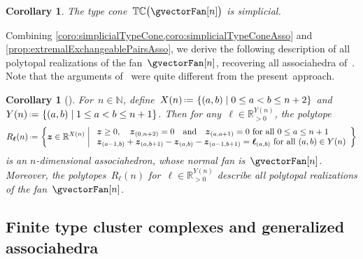 \documentclass{amsart}
\newtheorem{corollary}[theorem]{Corollary}
\theoremstyle{definition}
\newcommand{\R}{\mathbb{R}} %
\newcommand{\N}{\mathbb{N}} %
\renewcommand{\b}[1]{{\boldsymbol{#1}}} %
\newcommand{\set}[2]{\left\{ #1 \;\middle|\; #2 \right\}} %
\newcommand{\eqdef}{\mbox{\,\raisebox{0.2ex}{\scriptsize\ensuremath{\mathrm:}}\ensuremath{=}\,}} %
\newcommand{\vincent}[1]{\todo[color=blue!30]{#1 \\ \hfill --- V.}}
\newcommand{\typeCone}{\mathbb{TC}} %
\begin{document}
\begin{corollary}
\label{coro:simplicialTypeConeAsso}
The type cone~$\typeCone \big( \gvectorFan[n] \big)$ is simplicial.
\end{corollary}

Combining \cref{coro:simplicialTypeCone,coro:simplicialTypeConeAsso} and \cref{prop:extremalExchangeablePairsAsso}, we derive the following description of all polytopal realizations of the fan~$\gvectorFan[n]$, recovering all associahedra of~\cite[Sect.~3.2]{ArkaniHamedBaiHeYan}.
Note that the arguments of~\cite[Sect.~3.2]{ArkaniHamedBaiHeYan} were quite different from the present~approach.

\begin{corollary}[{\cite[Sect.~3.2]{ArkaniHamedBaiHeYan}}]
\label{coro:allPolytopalRealizationsAsso}
For~$n \in \N$, define~$X(n) \eqdef \set{(a,b)}{0 \le a < b \le n+2}$ and~$Y(n) \eqdef \set{(a,b)}{1 \le a < b \le n+1}$.
Then for any~$\b{\ell} \in \R_{>0}^{Y(n)}$, the polytope
\[
R_\b{\ell}(n) \eqdef \set{\b{z} \in \R^{X(n)}}{\begin{array}{l} \b{z} \ge 0, \quad \b{z}_{(0,n+2)} = 0 \quad\text{and}\quad \b{z}_{(a,a+1)} = 0 \text{ for all } 0 \le a \le n+1 \\ \b{z}_{(a-1,b)} + \b{z}_{(a,b+1)} - \b{z}_{(a,b)} - \b{z}_{(a-1,b+1)} = \b{\ell}_{(a,b)} \text{ for all } (a,b) \in Y(n) \end{array}}
\]
is an $n$-dimensional associahedron, whose normal fan is~$\gvectorFan[n]$.
Moreover, the polytopes~$R_\b{\ell}(n)$ for~$\b{\ell} \in \R_{>0}^{Y(n)}$ describe all polytopal realizations of the fan~$\gvectorFan[n]$.
\end{corollary}



\subsection{Finite type cluster complexes and generalized associahedra}
\label{subsec:typeConeCA}
\end{document}
